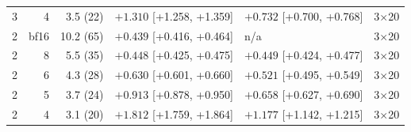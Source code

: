 \begin{tabular}{rrrllr}
3 & 4 & 3.5 (22) & $+1.310$ [+1.258, +1.359] & $+0.732$ [+0.700, +0.768] & 3$\times$20 \\
2 & bf16 & 10.2 (65) & $+0.439$ [+0.416, +0.464] & n/a & 3$\times$20 \\
2 & 8 & 5.5 (35) & $+0.448$ [+0.425, +0.475] & $+0.449$ [+0.424, +0.477] & 3$\times$20 \\
2 & 6 & 4.3 (28) & $+0.630$ [+0.601, +0.660] & $+0.521$ [+0.495, +0.549] & 3$\times$20 \\
2 & 5 & 3.7 (24) & $+0.913$ [+0.878, +0.950] & $+0.658$ [+0.627, +0.690] & 3$\times$20 \\
2 & 4 & 3.1 (20) & $+1.812$ [+1.759, +1.864] & $+1.177$ [+1.142, +1.215] & 3$\times$20 \\
\bottomrule
\end{tabular}
